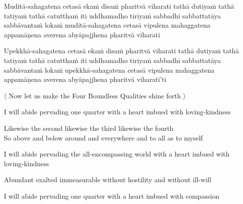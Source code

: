 \medskip

\begin{pali-hang}
Muditā-sahagatena cetasā ekaṁ disaṁ pharitvā viharati tathā dutiyaṁ tathā tatiyaṁ tathā catutthaṁ iti uddhamadho tiriyaṁ sabbadhi sabbattatāya sabbāvantaṁ lokaṁ muditā-sahagatena cetasā vipulena mahaggatena appamāṇena averena abyāpajjhena pharitvā viharati
\end{pali-hang}

\medskip

\begin{pali-hang}
Upekkhā-sahagatena cetasā ekaṁ disaṁ pharitvā viharati tathā dutiyaṁ tathā tatiyaṁ tathā catutthaṁ iti uddhamadho tiriyaṁ sabbadhi sabbattatāya sabbāvantaṁ lokaṁ upekkhā-sahagatena cetasā vipulena mahaggatena appamāṇena averena abyāpajjhena pharitvā viharatī'ti
\end{pali-hang}

\clearpage

\begin{leader-english}
  〈 Now let us make the Four Boundless Qualities shine forth 〉
\end{leader-english}
\begin{english-hang}
I will abide pervading one quarter with a heart imbued with loving-kindness\\
\end{english-hang}

\begin{english}
Likewise the second likewise the third likewise the fourth\\
So above and below around and everywhere and to all as to myself\\
\end{english}

\begin{english-hang}
I will abide pervading the all-encompassing world with a heart imbued with loving-kindness\\
\end{english-hang}

\begin{english-hang}
Abundant exalted immeasurable without hostility and without ill-will
\end{english-hang}

\medskip

\begin{english-hang}
I will abide pervading one quarter with a heart imbued with compassion\\
\end{english-hang}

